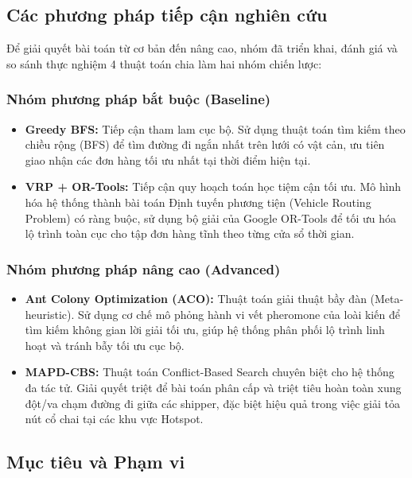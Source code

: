 \documentclass[conference]{IEEEtran}
\begin{document}
\subsection{Các phương pháp tiếp cận nghiên cứu}
Để giải quyết bài toán từ cơ bản đến nâng cao, nhóm đã triển khai, đánh giá và so sánh thực nghiệm 4 thuật toán chia làm hai nhóm chiến lược:

\subsubsection{Nhóm phương pháp bắt buộc (Baseline)}
\begin{itemize}
    \item \textbf{Greedy BFS:} Tiếp cận tham lam cục bộ. Sử dụng thuật toán tìm kiếm theo chiều rộng (BFS) để tìm đường đi ngắn nhất trên lưới có vật cản, ưu tiên giao nhận các đơn hàng tối ưu nhất tại thời điểm hiện tại.

    \item \textbf{VRP + OR-Tools:} Tiếp cận quy hoạch toán học tiệm cận tối ưu. Mô hình hóa hệ thống thành bài toán Định tuyến phương tiện (Vehicle Routing Problem) có ràng buộc, sử dụng bộ giải của Google OR-Tools để tối ưu hóa lộ trình toàn cục cho tập đơn hàng tĩnh theo từng cửa sổ thời gian.
\end{itemize}

\subsubsection{Nhóm phương pháp nâng cao (Advanced)}
\begin{itemize}
    \item \textbf{Ant Colony Optimization (ACO):} Thuật toán giải thuật bầy đàn (Meta-heuristic). Sử dụng cơ chế mô phỏng hành vi vết pheromone của loài kiến để tìm kiếm không gian lời giải tối ưu, giúp hệ thống phân phối lộ trình linh hoạt và tránh bẫy tối ưu cục bộ.

    \item \textbf{MAPD-CBS:} Thuật toán Conflict-Based Search chuyên biệt cho hệ thống đa tác tử. Giải quyết triệt để bài toán phân cấp và triệt tiêu hoàn toàn xung đột/va chạm đường đi giữa các shipper, đặc biệt hiệu quả trong việc giải tỏa nút cổ chai tại các khu vực Hotspot.
\end{itemize}

\subsection{Mục tiêu và Phạm vi}
\end{document}

